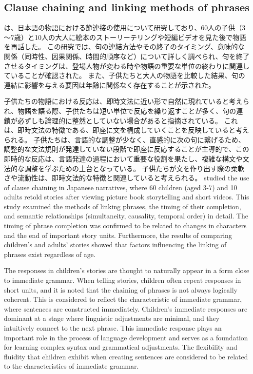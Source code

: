 \documentclass[a4paper,xelatex,ja=standard]{bxjsarticle}
\begin{document}
  \subsection{Clause chaining and linking methods of phrases}
\fi

\ifJPN
\textcite{10.3389/fpsyg.2019.03008}は、日本語の物語における節連接の使用について研究しており、60人の子供（3～7歳）と10人の大人に絵本のストーリーテリングや短編ビデオを見た後で物語を再話した。
この研究では、句の連結方法やその終了のタイミング、意味的な関係（同時性、因果関係、時間的順序など）について詳しく調べられ、句を終了させるタイミングは、登場人物が変わる時や物語の重要な単位の終わりに関連していることが確認された。
また、子供たちと大人の物語を比較した結果、句の連結に影響を与える要因は年齢に関係なく存在することが示された。

子供たちの物語における反応は、即時文法に近い形で自然に現れていると考えられ、物語を語る際、子供たちは短い単位で反応を繰り返すことが多く、句の連鎖が必ずしも論理的に整然としていない場合があると指摘されている。
これは、即時文法の特徴である、即座に文を構成していくことを反映していると考えられる。
子供たちは、言語的な調整が少なく、直感的に次の句に繋げるため、調整的な文法規則が発達していない段階で即座に反応することが主導的で、この即時的な反応は、言語発達の過程において重要な役割を果たし、複雑な構文や文法的な調整を学ぶための土台となっている。
子供たちが文を作り出す際の柔軟さや流動性は、即時文法的な特徴と関連していると考えられる。
\else
  \textcite{10.3389/fpsyg.2019.03008} studied the use of clause chaining in Japanese narratives, where 60 children (aged 3-7) and 10 adults retold stories after viewing picture book storytelling and short videos. This study examined the methods of linking phrases, the timing of their completion, and semantic relationships (simultaneity, causality, temporal order) in detail. The timing of phrase completion was confirmed to be related to changes in characters and the end of important story units. Furthermore, the results of comparing children's and adults' stories showed that factors influencing the linking of phrases exist regardless of age.  

  The responses in children's stories are thought to naturally appear in a form close to immediate grammar. When telling stories, children often repeat responses in short units, and it is noted that the chaining of phrases is not always logically coherent. This is considered to reflect the characteristic of immediate grammar, where sentences are constructed immediately. Children's immediate responses are dominant at a stage where linguistic adjustments are minimal, and they intuitively connect to the next phrase. This immediate response plays an important role in the process of language development and serves as a foundation for learning complex syntax and grammatical adjustments. The flexibility and fluidity that children exhibit when creating sentences are considered to be related to the characteristics of immediate grammar.
\fi
\end{document}

